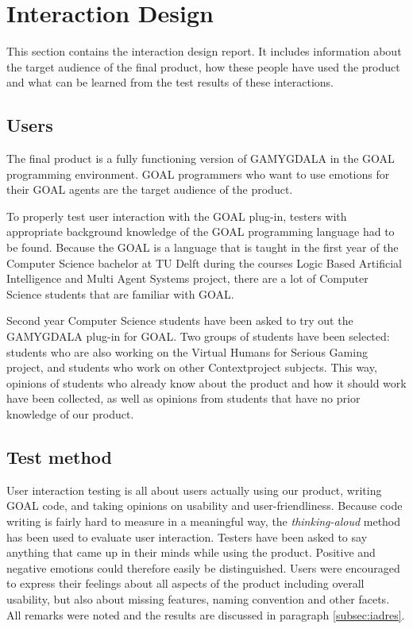 \section{Interaction Design}
This section contains the interaction design report. It includes information about the target audience of the final product, how these people have used the product and what can be learned from the test results of these interactions.

\subsection{Users}
The final product is a fully functioning version of GAMYGDALA in the GOAL programming environment. GOAL programmers who want to use emotions for their GOAL agents are the target audience of the product.

To properly test user interaction with the GOAL plug-in, testers with appropriate background knowledge of the GOAL programming language had to be found. Because the GOAL is a language that is taught in the first year of the Computer Science bachelor at TU Delft during the courses Logic Based Artificial Intelligence and Multi Agent Systems project, there are a lot of Computer Science students that are familiar with GOAL.

Second year Computer Science students have been asked to try out the GAMYGDALA plug-in for GOAL. Two groups of students have been selected: students who are also working on the Virtual Humans for Serious Gaming project, and students who work on other Contextproject subjects. This way, opinions of students who already know about the product and how it should work have been collected, as well as opinions from students that have no prior knowledge of our product.

\subsection{Test method}
User interaction testing is all about users actually using our product, writing GOAL code, and taking opinions on usability and user-friendliness. Because code writing is fairly hard to measure in a meaningful way, the \textit{thinking-aloud} method \citep{thinking-aloud} has been used to evaluate user interaction. Testers have been asked to say anything that came up in their minds while using the product. Positive and negative emotions could therefore easily be distinguished. Users were encouraged to express their feelings about all aspects of the product including overall usability, but also about missing features, naming convention and other facets. All remarks were noted and the results are discussed in paragraph \ref{subsec:iadres}.

